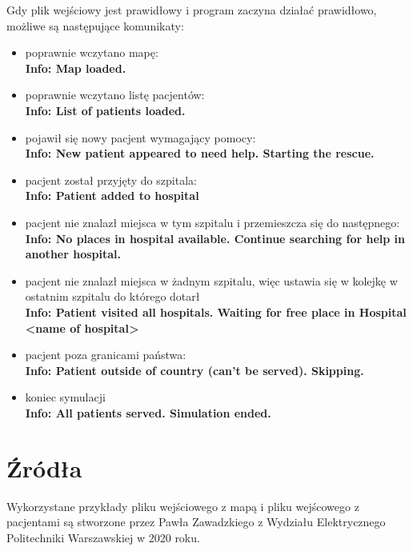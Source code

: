 \documentclass[10pt,a4paper]{article}
\begin{document}
Gdy plik wejściowy jest prawidłowy i program zaczyna działać prawidłowo, możliwe są następujące komunikaty:
\begin{itemize}
\item poprawnie wczytano mapę:\\ \textbf{Info: Map loaded.}
\item poprawnie wczytano listę pacjentów:\\ \textbf{Info: List of patients loaded.}
\item pojawił się nowy pacjent wymagający pomocy:\\ \textbf{Info: New patient appeared to need help. Starting the rescue.}
\item pacjent został przyjęty do szpitala:\\ \textbf{Info: Patient added to hospital}
\item pacjent nie znalazł miejsca w tym szpitalu i przemieszcza się do następnego:\\ \textbf{Info: No places in hospital available. Continue searching for help in another hospital.}
\item pacjent nie znalazł miejsca w żadnym szpitalu, więc ustawia się w kolejkę w ostatnim szpitalu do którego dotarł\\ 			\textbf{Info: Patient visited all hospitals. Waiting for free place in Hospital <name of hospital>}
\item pacjent poza granicami państwa: \\ \textbf{Info: Patient outside of country (can't be served). Skipping.}
\item koniec symulacji \\ \textbf{Info: All patients served. Simulation ended.}
\end{itemize}

\section{Źródła}
Wykorzystane przykłady pliku wejściowego z mapą i pliku wejścowego z pacjentami są stworzone przez Pawła Zawadzkiego z Wydziału Elektrycznego Politechniki Warszawskiej w 2020 roku.
\end{document}
